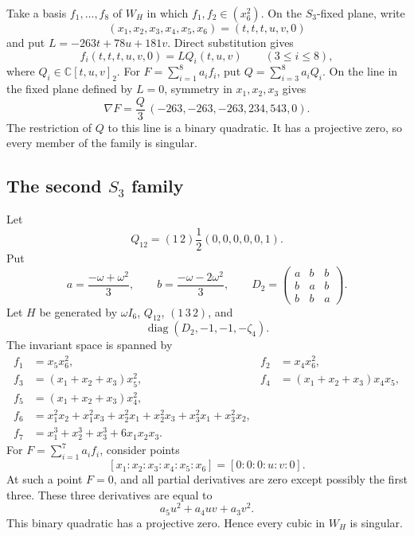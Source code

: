 \documentclass[12pt]{amsart}
\numberwithin{equation}{section}
\theoremstyle{plain}
\theoremstyle{definition}
\theoremstyle{remark}
\newcommand{\CC}{\mathbb C}
\DeclareMathOperator{\diag}{diag}
\begin{document}
Take a basis $f_1,\ldots,f_8$ of $W_H$ in which
$f_1,f_2\in(x_6^2)$.  On the $S_3$-fixed plane, write
\[
 (x_1,x_2,x_3,x_4,x_5,x_6)=(t,t,t,u,v,0)
\]
and put $L=-263t+78u+181v$.  Direct substitution gives
\[
 f_i(t,t,t,u,v,0)=LQ_i(t,u,v)\qquad(3\leq i\leq8),
\]
where $Q_i\in\CC[t,u,v]_2$.
For $F=\sum_{i=1}^8a_if_i$, put
$Q=\sum_{i=3}^8a_iQ_i$.  On the line in the fixed plane defined by
$L=0$, symmetry in $x_1,x_2,x_3$ gives
\[
 \nabla F=\frac{Q}{3}\,(-263,-263,-263,234,543,0).
\]
The restriction of $Q$ to this line is a binary quadratic.  It has a
projective zero, so every member of the family is singular.

\subsection{The second $S_3$ family}

Let
\[
 Q_{12}=(1\,2)\frac12(0,0,0,0,0,1).
\]
Put
\[
 a=\frac{-\omega+\omega^2}{3},\qquad
 b=\frac{-\omega-2\omega^2}{3},\qquad
 D_2=\begin{pmatrix}a&b&b\\b&a&b\\b&b&a\end{pmatrix}.
\]
Let $H$ be generated by $\omega I_6$, $Q_{12}$, $(1\,3\,2)$, and
\[
 \diag(D_2,-1,-1,-\zeta _4).
\]
The invariant space is spanned by
\begin{align*}
 f_1&=x_5x_6^2,& f_2&=x_4x_6^2,\\
 f_3&=(x_1+x_2+x_3)x_5^2,&
 f_4&=(x_1+x_2+x_3)x_4x_5,\\
 f_5&=(x_1+x_2+x_3)x_4^2,\\
 f_6&=x_1^2x_2+x_1^2x_3+x_2^2x_1+x_2^2x_3+x_3^2x_1+x_3^2x_2,\\
 f_7&=x_1^3+x_2^3+x_3^3+6x_1x_2x_3.
\end{align*}
For $F=\sum_{i=1}^7a_if_i$, consider points
\[
 [x_1:x_2:x_3:x_4:x_5:x_6]=[0:0:0:u:v:0].
\]
At such a point $F=0$, and all partial derivatives are zero except possibly
the first three.  These three derivatives are equal to
\[
 a_5u^2+a_4uv+a_3v^2.
\]
This binary quadratic has a projective zero.  Hence every cubic in $W_H$ is
singular.
%


\end{document}
